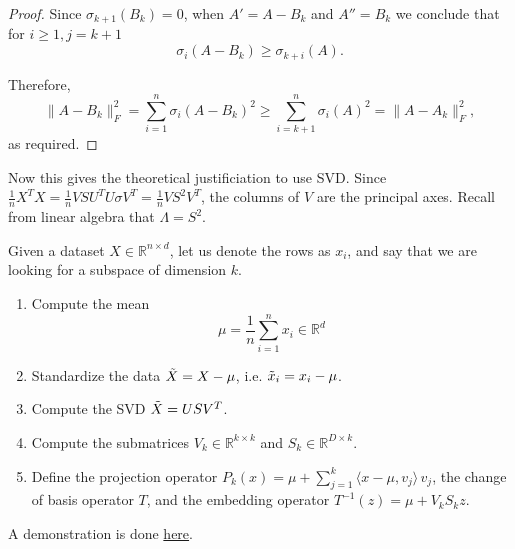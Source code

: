 \begin{proof}
    Since $\sigma_{k+1}(B_k) = 0$, when $A' = A - B_k$ and $A'' = B_k$ we conclude that for $i \geq 1, j = k + 1$
    \begin{equation}
      \sigma_i(A - B_k) \geq \sigma_{k+i}(A).
    \end{equation}

    Therefore,
    \begin{equation}
      \|A - B_k\|_F^2 = \sum_{i=1}^n \sigma_i(A - B_k)^2 \geq \sum_{i=k+1}^n \sigma_i(A)^2 = \|A - A_k\|_F^2,
    \end{equation}
    as required.
  \end{proof}

  Now this gives the theoretical justificiation to use SVD. Since $\frac{1}{n} X^T X = \frac{1}{n} V S U^T U \sigma V^T = \frac{1}{n} V S^2 V^T$, the columns of $V$ are the principal axes. Recall from linear algebra that $\Lambda = S^2$. 

  \begin{algo} 
    Given a dataset $X \in \mathbb{R}^{n \times d}$, let us denote the rows as $x_i$, and say that we are looking for a subspace of dimension $k$. 
    \begin{enumerate}
      \item Compute the mean 
      \begin{equation}
        \mu = \frac{1}{n} \sum_{i=1}^n x_i  \in \mathbb{R}^d
      \end{equation} 

      \item Standardize the data $\Tilde{X} = X - \mu$, i.e. $\Tilde{x}_i = x_i - \mu$.  

      \item Compute the SVD $\Tilde{X} = U S V^T$.

      \item Compute the submatrices $V_k \in \mathbb{R}^{k \times k}$ and $S_k \in \mathbb{R}^{D \times k}$. 

      \item Define the projection operator $P_k (x) = \mu + \sum_{j=1}^k \langle x - \mu, v_j \rangle \, v_j$, the change of basis operator $T$, and the embedding operator $T^{-1} (z) = \mu + V_k S_k z$. 
    \end{enumerate} 
    A demonstration is done \href{code/pca.html}{here}.
  \end{algo}

